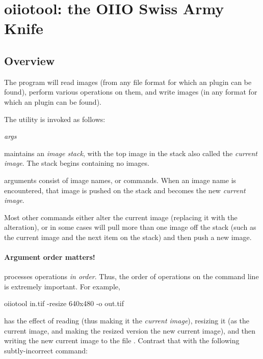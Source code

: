 \chapter{{\kw oiiotool}: the OIIO Swiss Army Knife}
\label{chap:oiiotool}

\section{Overview}


The \oiiotool program will read images (from any file format for which
an \ImageInput plugin can be found), perform various operations on them,
and write images (in any format for which an \ImageOutput plugin can be
found).

The \oiiotool utility is invoked as follows:

\medskip

\hspace{0.25in} \oiiotool \emph{args}

\medskip

\oiiotool maintains an \emph{image stack}, with the top image in the
stack also called the \emph{current image}.  The stack begins containing
no images.

\oiiotool arguments consist of image names, or commands.  When an
image name is encountered, that image is pushed on the stack and becomes
the new \emph{current image}.

Most other commands either alter the current image (replacing it with
the alteration), or in some cases will pull more than one image off the
stack (such as the current image and the next item on the stack) and
then push a new image.

\subsubsection*{Argument order matters!}

\oiiotool processes operations \emph{in order}. Thus, the order of operations
on the command line is extremely important. For example,

\begin{code}
    oiiotool in.tif -resize 640x480 -o out.tif
\end{code}

\noindent has the effect of reading  (thus making it the
\emph{current image}), resizing it (as the current image, and making the
resized version the new current image), and then writing the new current
image to the file .  Contrast that with the following
subtly-incorrect command:

